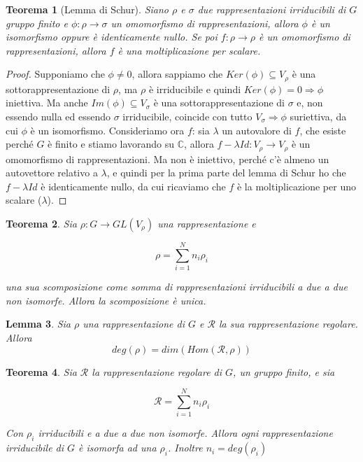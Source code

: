 \documentclass[11pt]{article}
\theoremstyle{plain}
\newtheorem{thm}{Teorema}[section]
\newtheorem{lemma}[thm]{Lemma}
\theoremstyle{definition}
\theoremstyle{remark}
\newcommand{\C}{\mathbb{C}}
\newcommand{\dsum}{\displaystyle\sum}
\begin{document}
\begin{thm}[Lemma di Schur]
Siano $\rho$ e $\sigma$ due rappresentazioni irriducibili di $G$ gruppo finito e $\phi:\rho\to\sigma$ un omomorfismo di rappresentazioni, allora $\phi$ è un isomorfismo oppure è identicamente nullo. Se poi $f:\rho\to\rho$ è un omomorfismo di rappresentazioni, allora $f$ è una moltiplicazione per scalare.
\end{thm}
\begin{proof}
Supponiamo che $\phi\neq0$, allora sappiamo che $Ker(\phi)\subseteq V_\rho$ è una sottorappresentazione di $\rho$, ma $\rho$ è irriducibile e quindi $Ker(\phi)=0\Rightarrow \phi$ iniettiva. Ma anche $Im(\phi)\subseteq V_{\sigma}$ è una sottorappresentazione di $\sigma$ e, non essendo nulla ed essendo $\sigma$ irriducibile, coincide con tutto $V_\sigma \Rightarrow \phi$ suriettiva, da cui $\phi$ è un isomorfismo.
Consideriamo ora $f$: sia $\lambda$ un autovalore di $f$, che esiste perché $G$ è finito e stiamo lavorando su $\C$, allora $f-\lambda Id:V_\rho\to V_\rho$ è un omomorfismo di rappresentazioni. Ma non è iniettivo, perché c'è almeno un autovettore relativo a $\lambda$, e quindi per la prima parte del lemma di Schur ho che $f-\lambda Id$ è identicamente nullo, da cui ricaviamo che $f$ è la moltiplicazione per uno scalare ($\lambda$).
\end{proof}


\begin{thm}
Sia $\rho: G \to GL(V_\rho)$ una rappresentazione e 

\[\rho = \dsum_{i=1}^N n_i \rho_i \]

una sua scomposizione come somma di rappresentazioni irriducibili a due a due non isomorfe. Allora la scomposizione è unica.
\end{thm}



\begin{lemma}
Sia $\rho$ una rappresentazione di $G$ e $\mathcal{R}$ la sua rappresentazione regolare. Allora 
\[deg(\rho) = dim(Hom(\mathcal{R}, \rho))\]
\end{lemma}




\begin{thm}
Sia $\mathcal{R}$ la rappresentazione regolare di $G$, un gruppo finito, e sia 

\[ \mathcal{R} = \dsum_{i=1}^Nn_i \rho_i\]

Con $\rho_i$ irriducibili e a due a due non isomorfe. Allora ogni rappresentazione irriducibile di $G$ è isomorfa ad una $\rho_i$. Inoltre $n_i = deg(\rho_i)$ 
\label{thm: teorema importantissimo}
\end{thm}
\end{document}
